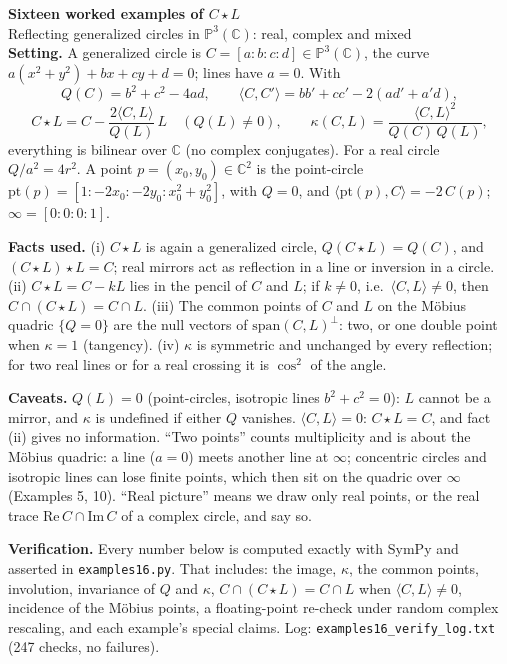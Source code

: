 \documentclass[10pt]{article}
\begin{document}
{\LARGE\bfseries Sixteen worked examples of $C\star L$}\\[2pt]
{\large Reflecting generalized circles in $\mathbb P^3(\mathbb C)$: real, complex and mixed}\\[6pt]
\textbf{Setting.} A generalized circle is $C=[a:b:c:d]\in\mathbb P^3(\mathbb C)$, the curve $a(x^2+y^2)+bx+cy+d=0$; lines have $a=0$. With
\[Q(C)=b^2+c^2-4ad,\qquad \langle C,C'\rangle=bb'+cc'-2(ad'+a'd),\]\[C\star L=C-\frac{2\langle C,L\rangle}{Q(L)}\,L\quad(Q(L)\neq0),\qquad \kappa(C,L)=\frac{\langle C,L\rangle^2}{Q(C)\,Q(L)},\]
everything is bilinear over $\mathbb C$ (no complex conjugates). For a real circle $Q/a^2=4r^2$. A point $p=(x_0,y_0)\in\mathbb C^2$ is the point-circle $\mathrm{pt}(p)=[1:-2x_0:-2y_0:x_0^2+y_0^2]$, with $Q=0$, and $\langle \mathrm{pt}(p),C\rangle=-2\,C(p)$; $\infty=[0:0:0:1]$.

\textbf{Facts used.} (i) $C\star L$ is again a generalized circle, $Q(C\star L)=Q(C)$, and $(C\star L)\star L=C$; real mirrors act as reflection in a line or inversion in a circle. (ii) $C\star L=C-kL$ lies in the pencil of $C$ and $L$; if $k\neq0$, i.e.\ $\langle C,L\rangle\neq0$, then $C\cap(C\star L)=C\cap L$. (iii) The common points of $C$ and $L$ on the Möbius quadric $\{Q=0\}$ are the null vectors of $\mathrm{span}(C,L)^\perp$: two, or one double point when $\kappa=1$ (tangency). (iv) $\kappa$ is symmetric and unchanged by every reflection; for two real lines or for a real crossing it is $\cos^2$ of the angle.

\textbf{Caveats.} $Q(L)=0$ (point-circles, isotropic lines $b^2+c^2=0$): $L$ cannot be a mirror, and $\kappa$ is undefined if either $Q$ vanishes. $\langle C,L\rangle=0$: $C\star L=C$, and fact (ii) gives no information. ``Two points'' counts multiplicity and is about the Möbius quadric: a line ($a=0$) meets another line at $\infty$; concentric circles and isotropic lines can lose finite points, which then sit on the quadric over $\infty$ (Examples 5, 10). ``Real picture'' means we draw only real points, or the real trace $\mathrm{Re}\,C\cap\mathrm{Im}\,C$ of a complex circle, and say so.

\textbf{Verification.} Every number below is computed exactly with SymPy and asserted in \texttt{examples16.py}. That includes: the image, $\kappa$, the common points, involution, invariance of $Q$ and $\kappa$, $C\cap(C\star L)=C\cap L$ when $\langle C,L\rangle\neq0$, incidence of the Möbius points, a floating-point re-check under random complex rescaling, and each example's special claims. Log: \texttt{examples16\_verify\_log.txt} (247 checks, no failures).
\end{document}
